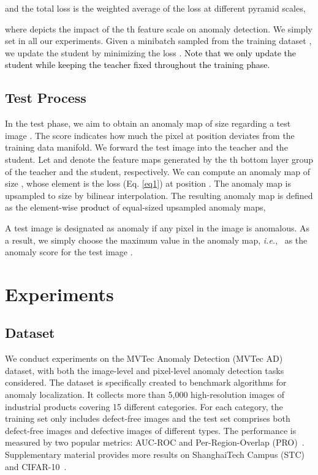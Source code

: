 \documentclass{bmvc2k}
\def\ie{\emph{i.e.}} \def\Ie{\emph{I.e}}
\newcommand{\wgd}[1]{\textcolor{black}{{}#1}}
\begin{document}
and the total loss is the weighted average of the loss at different pyramid scales,

where  depicts the impact of the th feature scale on anomaly detection. We simply set  in all our experiments. Given a minibatch  sampled from the training dataset , we update the student by minimizing the loss . \wgd{Note that we only update the student while keeping the teacher fixed throughout the training phase.}

\subsection{Test Process}
\label{sec3-sub2}

In the test phase, we aim to obtain an anomaly map  of size  regarding a test image . The score  indicates how much the pixel at position  deviates from the training data manifold. We forward the test image  into the teacher and the student. Let  and  denote the feature maps generated by the th bottom layer group of the teacher and the student, respectively. We can compute an anomaly map  of size , whose element  is the loss (Eq. \ref{eq1}) at position . The anomaly map  is upsampled to size  by bilinear interpolation. The resulting anomaly map is defined as the element-wise \wgd{product} of  equal-sized upsampled anomaly maps,

A test image is designated as anomaly if any pixel in the image is anomalous. As a result, we simply choose the maximum value in the anomaly map, \ie,~ as the anomaly score for the test image .

\section{Experiments}
\label{sec4}

\subsection{Dataset}
We conduct experiments on the MVTec Anomaly Detection (MVTec AD)~\cite{Bergmann2019} dataset, with both the image-level and pixel-level anomaly detection tasks considered. The dataset is specifically created to benchmark algorithms for anomaly localization. It collects more than 5,000 high-resolution images of industrial products covering 15 different categories. For each category, the training set only includes defect-free images and the test set comprises both defect-free images and defective images of different types. The performance is measured by two popular metrics: AUC-ROC and Per-Region-Overlap (PRO)~\cite{Bergmann2020}. Supplementary material provides more results on ShanghaiTech Campus (STC)~\cite{Luo_2017_ICCV} and CIFAR-10~\cite{Krizhevsky2009}.
\end{document}
